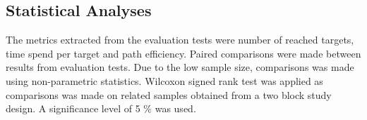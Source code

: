 \subsection{Statistical Analyses}
The metrics extracted from the evaluation tests were number of reached targets, time spend per target and path efficiency. Paired comparisons were made between results from evaluation tests. Due to the low sample size, comparisons was made using non-parametric statistics. Wilcoxon signed rank test was applied as comparisons was made on related samples obtained from a two block study design. A significance level of 5 $\%$ was used.